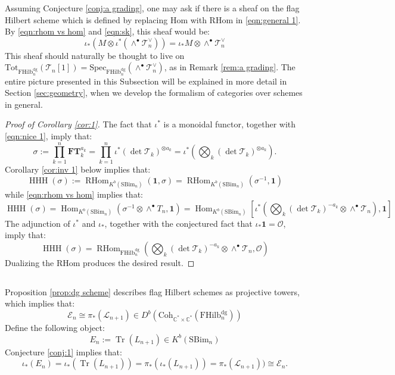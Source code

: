 \documentclass[12pt]{amsart}
\numberwithin{equation}{section}
\theoremstyle{definition}
\theoremstyle{remark}
\DeclareMathOperator{\Tr}{Tr}
\DeclareMathOperator{\Hom}{Hom}
\DeclareMathOperator{\RHom}{{RHom}}
\DeclareMathOperator{\HHH}{HHH}
\newcommand{\CC}{\mathbb{C}}
\newcommand{\CE}{\mathcal{E}}
\newcommand{\CL}{\mathcal{L}}
\newcommand{\CO}{\mathcal{O}}
\newcommand{\CT}{\mathcal{T}}
\newcommand{\FT}{\mathbf{FT}}
\renewcommand{\1}{\mathbf{1}}
\newcommand{\coh}{\mathrm{Coh}}
\newcommand{\FH}{\mathrm{FHilb}}
\newcommand{\spec}{\mathrm{Spec}}
\newcommand{\SBim}{\mathrm{SBim}}
\newcommand{\torus}{\CC^{*} \times \CC^*}
\newcommand{\dg}{\text{dg}}%
\newcommand{\tot}{\mathrm{Tot}}
\begin{document}
Assuming Conjecture \ref{conj:a grading}, one may ask if there is a sheaf on the flag Hilbert scheme which is defined by replacing Hom with RHom in \eqref{eqn:general 1}. By \eqref{eqn:rhom vs hom} and \eqref{eqn:sk}, this sheaf would be:
$$
\iota_* \left(M \otimes \iota^*\left(\wedge^\bullet \CT_n^\vee \right)\right) = \iota_*M \otimes \wedge^\bullet \CT_n^\vee
$$
This sheaf should naturally be thought to live on $\tot_{\FH_n^\dg} (\CT_n[1]) = \spec_{\FH_n^\dg} \left(\wedge^\bullet \CT_n^\vee \right)$, as in Remark \ref{rem:a grading}. The entire picture presented in this Subsection will be explained in more detail in Section \ref{sec:geometry}, when we develop the formalism of categories over schemes in general. 

\begin{proof}[Proof of Corollary \ref{cor:1}] The fact that $\iota^*$ is a monoidal functor, together with \eqref{eqn:nice 1}, imply that:
$$
\sigma := \prod_{k=1}^n \FT_k^{a_k} = \prod_{k=1}^n \iota^{*}(\det \CT_k)^{\otimes a_k} = \iota^*\left(\bigotimes_{k} (\det \CT_k)^{\otimes a_k}\right).
$$
Corollary \ref{cor:inv 1} below implies that:
$$
\HHH( \sigma ) := \RHom_{K^b(\SBim_n)}(\1, \sigma)= \RHom_{K^b(\SBim_n)}(\sigma^{-1} , \1)
$$
while \eqref{eqn:rhom vs hom} implies that:
$$
\HHH( \sigma ) = \Hom_{K^b(\SBim_n)}(\sigma^{-1} \otimes \wedge^\bullet T_n, \1) = \Hom_{K^b(\SBim_n)} \left[ \iota^*\left(\bigotimes_{k} (\det \CT_k)^{-a_k} \otimes \wedge^\bullet \CT_n \right) , \1 \right]
$$
The adjunction of $\iota^*$ and $\iota_*$, together with the conjectured fact that $\iota_*\1 = \CO$, imply that:
$$
\HHH( \sigma ) = \RHom_{\FH_n^\dg} \left( \bigotimes_{k} (\det \CT_k)^{-a_k} \otimes \wedge^\bullet \CT_n, \CO \right) 
$$
Dualizing the RHom produces the desired result. 
\end{proof}

\subsection{}
\label{sub:topological computations}

Proposition \ref{prop:dg scheme} describes flag Hilbert schemes as projective towers, which implies that:
$$
\CE_n \cong \pi_*(\CL_{n+1}) \in D^b \left(\coh_{\torus} \left( \FH_n^\dg \right) \right)
$$
Define the following object:
\begin{equation}
\label{eqn:def e}
E_n := \Tr(L_{n+1}) \in K^b(\SBim_n)
\end{equation}
Conjecture \ref{conj:1} implies that:
\begin{equation}
\label{eqn:relation e}
\iota_*(E_n) = \iota_*(\Tr(L_{n+1})) = \pi_*(\iota_*(L_{n+1})) = \pi_*(\CL_{n+1})) \cong \CE_n.
\end{equation}
\end{document}
